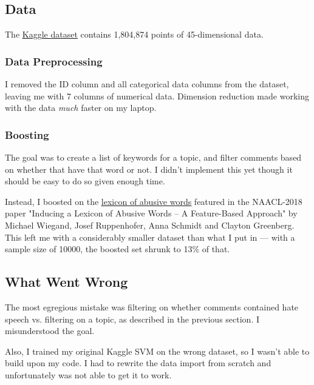 \documentclass[11pt,a4paper]{article}
\begin{document}
\subsection{Data}
The \underline{\href{https://www.kaggle.com/c/jigsaw-unintended-bias-in-toxicity-classification/data}{Kaggle dataset}} contains 1,804,874 points of 45-dimensional data.

\subsubsection{Data Preprocessing}
I removed the ID column and all categorical data columns from the dataset, leaving me with 7 columns of numerical data. Dimension reduction made working with the data \textit{much} faster on my laptop.

\subsubsection{Boosting}
The goal was to create a list of keywords for a topic, and filter comments based on whether that have that word or not. I didn't implement this yet though it should be easy to do so given enough time.

Instead, I boosted on the \underline{\href{https://github.com/uds-lsv/lexicon-of-abusive-words}{lexicon of abusive words}} featured in the NAACL-2018 paper "Inducing a Lexicon of Abusive Words -- A Feature-Based Approach" by Michael Wiegand, Josef Ruppenhofer, Anna Schmidt and Clayton Greenberg. This left me with a considerably smaller dataset than what I put in --- with a sample size of 10000, the boosted set shrunk to 13\% of that.

\subsection{What Went Wrong}
The most egregious mistake was filtering on whether comments contained hate speech vs. filtering on a topic, as described in the previous section. I misunderstood the goal.

Also, I trained my original Kaggle SVM on the wrong dataset, so I wasn't able to build upon my code. I had to rewrite the data import from scratch and unfortunately was not able to get it to work.

\end{document}

